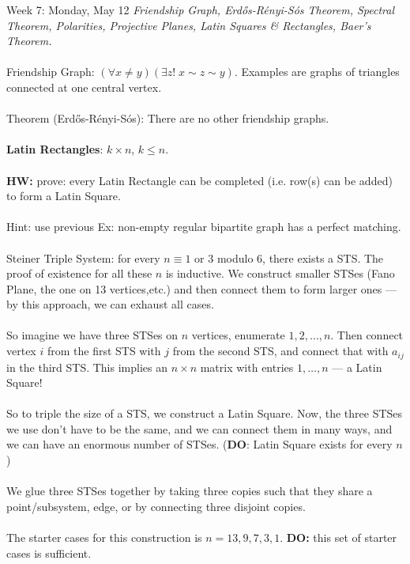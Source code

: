 \documentclass[12pt]{article}
\theoremstyle{remark}
\begin{document}
\newpage
\label{19}\begin{section}{Week 7: Monday, May 12}
\indent\textit{Friendship Graph, Erd\H{o}s-R\'enyi-S\'os Theorem, Spectral Theorem, Polarities, Projective Planes, Latin Squares \& Rectangles, Baer's Theorem.}\\\\
Friendship Graph: $(\forall x \neq y)(\exists z ! \; x \sim z \sim y)$. Examples are graphs of triangles connected at one central vertex.
\\\\
Theorem (Erd\H{o}s-R\'enyi-S\'os): There are no other friendship graphs.
\\\\
\textbf{Latin Rectangles}: $k \times n$, $k \leq n$. 
\\\\\textbf{HW:} prove: every Latin Rectangle can be completed (i.e. row(s) can be added) to form a Latin Square.
\\\\
Hint: use previous Ex: non-empty regular bipartite graph has a perfect matching.
\\\\
Steiner Triple System: for every $n \equiv 1$ or $3$ modulo $6$, there exists a STS. The proof of existence for all these $n$ is inductive. We construct smaller STSes (Fano Plane, the one on 13 vertices,etc.) and then connect them to form larger ones --- by this approach, we can exhaust all cases.
\\\\
So imagine we have three STSes on $n$ vertices, enumerate $1,2,\ldots,n$. Then connect vertex $i$ from the first STS with $j$ from the second STS, and connect that with $a_{ij}$ in the third STS. This implies an $n \times n$ matrix with entries $1,\ldots,n$ --- a  Latin Square!
\\\\
So to triple the size of a STS, we construct a Latin Square. Now, the three STSes we use don't have to be the same, and we can connect them in many ways, and we can have an enormous number of STSes. (\textbf{DO}: Latin Square exists for every $n$)
\\\\
We glue three STSes together by taking three copies such that they share a point/subsystem, edge, or by connecting three disjoint copies.
\\\\
The starter cases for this construction is $n = 13,9,7,3,1$. \textbf{DO:} this set of starter cases is sufficient. 

\end{section}
\end{document}
